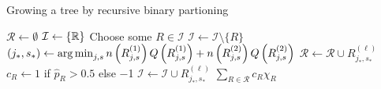   \begin{algorithm}
    \caption{Growing a tree by recursive binary partioning} \label{alg:tree}
    \begin{algorithmic}[1]
        \State $\mathcal{R} \gets \emptyset$ 
        \State $\mathcal{I} \gets \{ \mathbb{R} \}$ 
          \State Choose some $R \in \mathcal{I}$
          \State $\mathcal{I} \gets \mathcal{I} \setminus \{ R \}$
          \State $(j_*, s_*) \gets \operatorname*{arg\,min}_{j, s} n\left(R_{j,s}^{(1)}\right) Q\left(R_{j,s}^{(1)}\right) + 
            n\left(R_{j,s}^{(2)}\right) Q\left(R_{j,s}^{(2)}\right)$ \label{alg:tree:split}
              \State $\mathcal{R} \gets \mathcal{R} \cup R_{j_*, s_*}^{(\ell)}$
              \State $c_R \gets 1$ if $\hat{p}_R > \num{0.5}$ else \num{-1}
            \Else
              \State $\mathcal{I} \gets \mathcal{I} \cup R_{j_*, s_*}^{(\ell)}$
            \EndIf
          \EndFor
        \EndWhile
        \State \Return $\sum_{R \in \mathcal{R}} c_R \chi_R$
      \EndFunction
    \end{algorithmic}
  \end{algorithm}